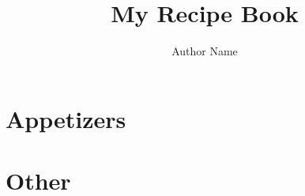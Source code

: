 \documentclass{book}
\title{My Recipe Book}
\author{Author Name}
\begin{document}
\frontmatter

\mainmatter

\part{Appetizers}


\part{Other}

\end{document}
